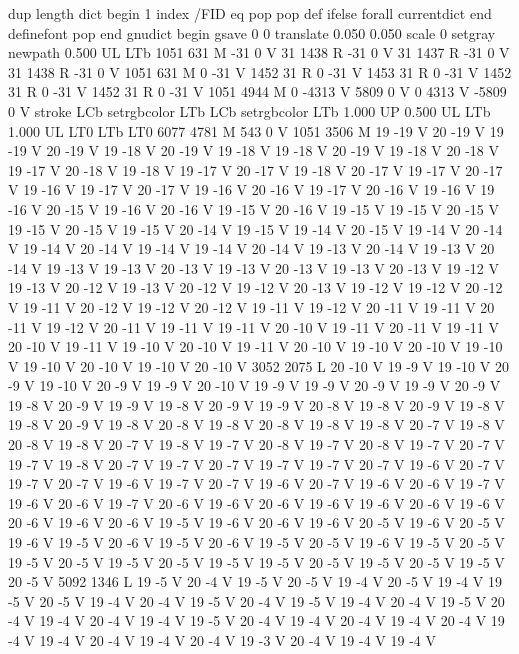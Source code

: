 {{{{{dup length dict begin {1 index /FID eq {pop pop} {def} ifelse} forall
currentdict end definefont pop
end
gnudict begin
gsave
0 0 translate
0.050 0.050 scale
0 setgray
newpath
0.500 UL
LTb
1051 631 M
-31 0 V
31 1438 R
-31 0 V
31 1437 R
-31 0 V
31 1438 R
-31 0 V
1051 631 M
0 -31 V
1452 31 R
0 -31 V
1453 31 R
0 -31 V
1452 31 R
0 -31 V
1452 31 R
0 -31 V
1051 4944 M
0 -4313 V
5809 0 V
0 4313 V
-5809 0 V
stroke
LCb setrgbcolor
LTb
LCb setrgbcolor
LTb
1.000 UP
0.500 UL
LTb
1.000 UL
LT0
LTb
LT0
6077 4781 M
543 0 V
1051 3506 M
19 -19 V
20 -19 V
19 -19 V
20 -19 V
19 -18 V
20 -19 V
19 -18 V
19 -18 V
20 -19 V
19 -18 V
20 -18 V
19 -17 V
20 -18 V
19 -18 V
19 -17 V
20 -17 V
19 -18 V
20 -17 V
19 -17 V
20 -17 V
19 -16 V
19 -17 V
20 -17 V
19 -16 V
20 -16 V
19 -17 V
20 -16 V
19 -16 V
19 -16 V
20 -15 V
19 -16 V
20 -16 V
19 -15 V
20 -16 V
19 -15 V
19 -15 V
20 -15 V
19 -15 V
20 -15 V
19 -15 V
20 -14 V
19 -15 V
19 -14 V
20 -15 V
19 -14 V
20 -14 V
19 -14 V
20 -14 V
19 -14 V
19 -14 V
20 -14 V
19 -13 V
20 -14 V
19 -13 V
20 -14 V
19 -13 V
19 -13 V
20 -13 V
19 -13 V
20 -13 V
19 -13 V
20 -13 V
19 -12 V
19 -13 V
20 -12 V
19 -13 V
20 -12 V
19 -12 V
20 -13 V
19 -12 V
19 -12 V
20 -12 V
19 -11 V
20 -12 V
19 -12 V
20 -12 V
19 -11 V
19 -12 V
20 -11 V
19 -11 V
20 -11 V
19 -12 V
20 -11 V
19 -11 V
19 -11 V
20 -10 V
19 -11 V
20 -11 V
19 -11 V
20 -10 V
19 -11 V
19 -10 V
20 -10 V
19 -11 V
20 -10 V
19 -10 V
20 -10 V
19 -10 V
19 -10 V
20 -10 V
19 -10 V
20 -10 V
3052 2075 L
20 -10 V
19 -9 V
19 -10 V
20 -9 V
19 -10 V
20 -9 V
19 -9 V
20 -10 V
19 -9 V
19 -9 V
20 -9 V
19 -9 V
20 -9 V
19 -8 V
20 -9 V
19 -9 V
19 -8 V
20 -9 V
19 -9 V
20 -8 V
19 -8 V
20 -9 V
19 -8 V
19 -8 V
20 -9 V
19 -8 V
20 -8 V
19 -8 V
20 -8 V
19 -8 V
19 -8 V
20 -7 V
19 -8 V
20 -8 V
19 -8 V
20 -7 V
19 -8 V
19 -7 V
20 -8 V
19 -7 V
20 -8 V
19 -7 V
20 -7 V
19 -7 V
19 -8 V
20 -7 V
19 -7 V
20 -7 V
19 -7 V
19 -7 V
20 -7 V
19 -6 V
20 -7 V
19 -7 V
20 -7 V
19 -6 V
19 -7 V
20 -7 V
19 -6 V
20 -7 V
19 -6 V
20 -6 V
19 -7 V
19 -6 V
20 -6 V
19 -7 V
20 -6 V
19 -6 V
20 -6 V
19 -6 V
19 -6 V
20 -6 V
19 -6 V
20 -6 V
19 -6 V
20 -6 V
19 -5 V
19 -6 V
20 -6 V
19 -6 V
20 -5 V
19 -6 V
20 -5 V
19 -6 V
19 -5 V
20 -6 V
19 -5 V
20 -6 V
19 -5 V
20 -5 V
19 -6 V
19 -5 V
20 -5 V
19 -5 V
20 -5 V
19 -5 V
20 -5 V
19 -5 V
19 -5 V
20 -5 V
19 -5 V
20 -5 V
19 -5 V
20 -5 V
5092 1346 L
19 -5 V
20 -4 V
19 -5 V
20 -5 V
19 -4 V
20 -5 V
19 -4 V
19 -5 V
20 -5 V
19 -4 V
20 -4 V
19 -5 V
20 -4 V
19 -5 V
19 -4 V
20 -4 V
19 -5 V
20 -4 V
19 -4 V
20 -4 V
19 -4 V
19 -5 V
20 -4 V
19 -4 V
20 -4 V
19 -4 V
20 -4 V
19 -4 V
19 -4 V
20 -4 V
19 -4 V
20 -4 V
19 -3 V
20 -4 V
19 -4 V
19 -4 V
}}}}}

